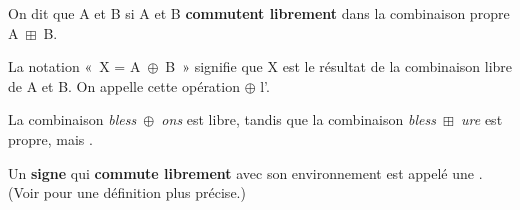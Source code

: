 \begin{styleLivreImportant}
On dit que A et B  si A et B \textbf{commutent librement} dans la combinaison propre A~${\boxplus}$~B.
\end{styleLivreImportant}

\begin{styleLivreImportant}
La notation «~X = A~${\oplus}$~B~» signifie que X est le résultat de la combinaison libre de A et B. On appelle cette opération ${\oplus}$ l’.
\end{styleLivreImportant}

La combinaison \textit{bless~}${\oplus}$\textit{~ons} est libre, tandis que la combinaison \textit{bless~}${\boxplus}$\textit{~ure} est propre, mais .

\begin{styleLivreImportant}
Un \textbf{signe} qui \textbf{commute librement} avec son environnement est appelé une . (Voir  pour une définition plus précise.)
\end{styleLivreImportant}

